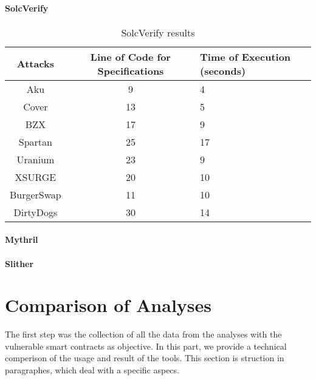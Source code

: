 \paragraph{SolcVerify}

\begin{center}
    \begin{table*}
        \caption{SolcVerify results}
                \label{tab:SolcVerifyTable}
                \begin{tabular}{ccl}
                \toprule
                    Attacks & Line of Code for Specifications & Time of Execution (seconds)\\
                    \midrule
                    Aku & 9 & 4 \\ 
                    Cover & 13  & 5 \\ 
                    BZX & 17  & 9  \\ 
                    Spartan & 25 &  17 \\ 
                    Uranium  &  23 & 9 \\ 
                    XSURGE & 20 & 10 \\  
                    BurgerSwap & 11 & 10  \\ 
                    DirtyDogs &  30 &  14\\
                \bottomrule
        \end{tabular}
    \end{table*}
    
\end{center}
\paragraph{Mythril}

\paragraph{Slither}



\section{Comparison of Analyses}

The first step was the collection of all the data from the analyses with the vulnerable smart contracts as objective. 
In this part, we provide a technical comperison of the usage and result of the tools. 
This section is struction in paragraphes, which deal with a specific aspecs.

